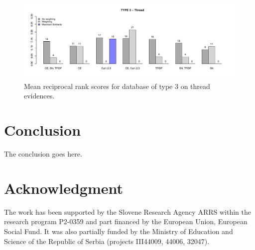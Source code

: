 \documentclass[conference]{IEEEtran}
\begin{document}
\begin{figure}[!t]
	\centering
	\includegraphics[width=\textwidth]{mrrType3Thread.pdf}
	\caption{Mean reciprocal rank scores for database of type 3 on thread evidences.}
	\label{fig:mrrtype3}
\end{figure}

\section{Conclusion}
\label{sec:conclusion}
The conclusion goes here.






\section*{Acknowledgment}
The work has been supported by the Slovene Research Agency ARRS within the research program P2-0359 and part financed by the European Union, European Social Fund. It was also partially funded by the Ministry of Education and Science of the Republic of Serbia (projects III44009, 44006, 32047).









%






\end{document}
